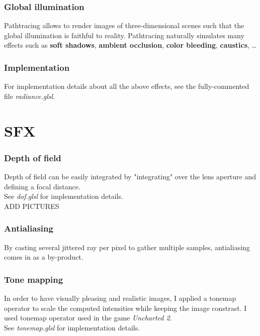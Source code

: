 \documentclass[a4paper,10pt]{article}
\begin{document}
\subsubsection{Global illumination}

Pathtracing allows to render images of three-dimensional scenes such that the global illumination is faithful to reality. Pathtracing naturally simulates many effects such as \textbf{soft shadows}, \textbf{ambient occlusion}, \textbf{color bleeding}, \textbf{caustics}, \ldots

\subsubsection{Implementation}
For implementation details about all the above effects, see the fully-commented file \textit{radiance.glsl}.

\section{SFX}

\subsubsection{Depth of field}

Depth of field can be easily integrated by "integrating" over the lens aperture and defining a focal distance. \\
See \textit{dof.glsl} for implementation details.\\

ADD PICTURES


\subsubsection{Antialiasing}

By casting several jittered ray per pixel to gather multiple samples, antialiasing comes in as a by-product.  

\subsubsection{Tone mapping}

In order to have visually pleasing and realistic images, I applied a tonemap operator to scale the computed intensities while keeping the image constrast. I used tonemap operator used in the game \textit{Uncharted 2}.\\
See \textit{tonemap.glsl} for implementation details.
\end{document}
